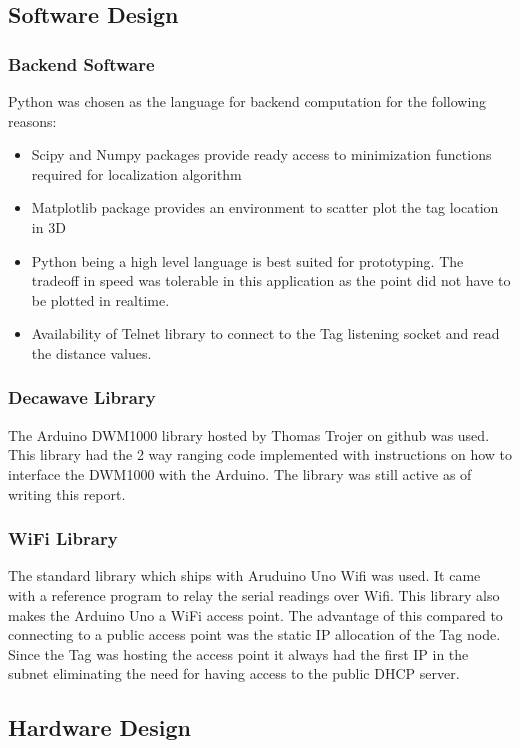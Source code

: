 \documentclass[journal,transmag]{IEEEtran}
\begin{document}
\subsection{Software Design}

\subsubsection{Backend Software}
Python was chosen as the language for backend computation for the following reasons:
\begin{itemize}
    \item Scipy and Numpy packages provide ready access to minimization functions required for localization algorithm
    \item Matplotlib package provides an environment to scatter plot the tag location in 3D
    \item Python being a high level language is best suited for prototyping. The tradeoff in speed was tolerable in this application as the point did not have to be plotted in realtime.
    \item Availability of Telnet library to connect to the Tag listening socket and read the distance values.
\end{itemize}
\subsubsection{Decawave Library}
The Arduino DWM1000 library hosted by Thomas Trojer on github was used\cite{thotro:2017}. This library had the 2 way ranging code implemented with instructions on how to interface the DWM1000 with the Arduino. The library was still active as of writing this report.

\subsubsection{WiFi Library}
The standard library which ships with Aruduino Uno Wifi was used. It came with a reference program to relay the serial readings over Wifi. This library also makes the Arduino Uno a WiFi access point. The advantage of this compared to connecting to a public access point was the static IP allocation of the Tag node. Since the Tag was hosting the access point it always had the first IP in the subnet eliminating the need for having access to the public DHCP server.

\subsection{Hardware Design}
\end{document}
